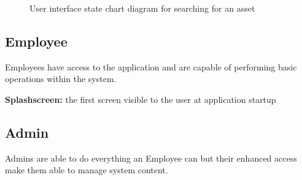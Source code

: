 \begin{figure}[H]
    \centering
    \caption{User interface state chart diagram for searching for an asset}
    \label{fig:add_asset_with_tags}
\end{figure}


\subsection{Employee}
Employees have access to the application and are capable of performing basic operations within the system.

\textbf{Splashscreen:} the first screen visible to the user at application startup 


\subsection{Admin}
Admins are able to do everything an Employee can but their enhanced access make them able to manage system content.

% 
